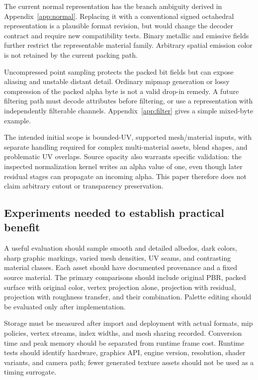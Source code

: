 \documentclass[11pt,letterpaper]{article}
\begin{document}
The current normal representation has the branch ambiguity derived in Appendix~\ref{app:normal}. Replacing it with a conventional signed octahedral representation is a plausible format revision, but would change the decoder contract and require new compatibility tests. Binary metallic and emissive fields further restrict the representable material family. Arbitrary spatial emission color is not retained by the current packing path.

Uncompressed point sampling protects the packed bit fields but can expose aliasing and unstable distant detail. Ordinary mipmap generation or lossy compression of the packed alpha byte is not a valid drop-in remedy. A future filtering path must decode attributes before filtering, or use a representation with independently filterable channels. Appendix~\ref{app:filter} gives a simple mixed-byte example.

The intended initial scope is bounded-UV, supported mesh/material inputs, with separate handling required for complex multi-material assets, blend shapes, and problematic UV overlaps. Source opacity also warrants specific validation: the inspected normalization kernel writes an alpha value of one, even though later residual stages can propagate an incoming alpha. This paper therefore does not claim arbitrary cutout or transparency preservation.

\subsection{Experiments needed to establish practical benefit}
\label{sec:evaluation}
A useful evaluation should sample smooth and detailed albedos, dark colors, sharp graphic markings, varied mesh densities, UV seams, and contrasting material classes. Each asset should have documented provenance and a fixed source material. The primary comparisons should include original PBR, packed surface with original color, vertex projection alone, projection with residual, projection with roughness transfer, and their combination. Palette editing should be evaluated only after implementation.

Storage must be measured after import and deployment with actual formats, mip policies, vertex streams, index widths, and mesh sharing recorded. Conversion time and peak memory should be separated from runtime frame cost. Runtime tests should identify hardware, graphics API, engine version, resolution, shader variants, and camera path; fewer generated texture assets should not be used as a timing surrogate.
\end{document}
